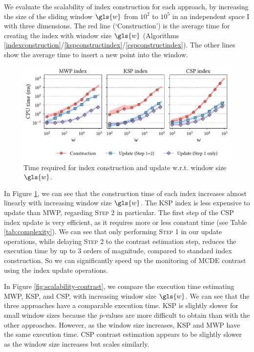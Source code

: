 We evaluate the scalability of index construction for each approach, by increasing the size of the sliding window $\gls{w}$ from $10^2$ to $10^5$ in an independent space I with three dimensions. 
The red line (`Construction') is the average time for creating the index with window size $\gls{w}$ (Algorithms \ref{indexconstruction}/\ref{kspconstructindex}/\ref{cspconstructindex}). 
The other lines show the average time to insert a new point into the window.   
\begin{figure}
    \includegraphics[width=\linewidth]{part2-figures/indexperformance_thesis-compressed.pdf}
    \caption{Time required for index construction and update w.r.t. window size $\gls{w}$.}
    \label{fig:scalability-index}
\end{figure}

In Figure \ref{fig:scalability-index}, we can see that the construction time of each index increases almost linearly with increasing window size $\gls{w}$. 
The \gls{KSP} index is less expensive to update than \gls{MWP}, regarding \textsc{Step 2} in particular. 
The first step of the \gls{CSP} index update is very efficient, as it requires more or less constant time (see Table \ref{tab:complexity}). 
We can see that only performing \textsc{Step 1} in our update operations, while delaying \textsc{Step 2} to the contrast estimation step, reduces the execution time by up to 3 orders of magnitude, compared to standard index construction. 
So we can significantly speed up the monitoring of \gls{MCDE} contrast using the index update operations. 

In Figure \ref{fig:scalability-contrast}, we compare the execution time estimating \gls{MWP}, \gls{KSP}, and \gls{CSP}, with increasing window size $\gls{w}$. 
We can see that the three approaches have a comparable execution time. 
\gls{KSP} is slightly slower for small window sizes because the $\overline{p}$-values are more difficult to obtain than with the other approaches. 
However, as the window size increases, \gls{KSP} and \gls{MWP} have the same execution time. 
\gls{CSP} contrast estimation appears to be slightly slower as the window size increases but scales similarly. 


